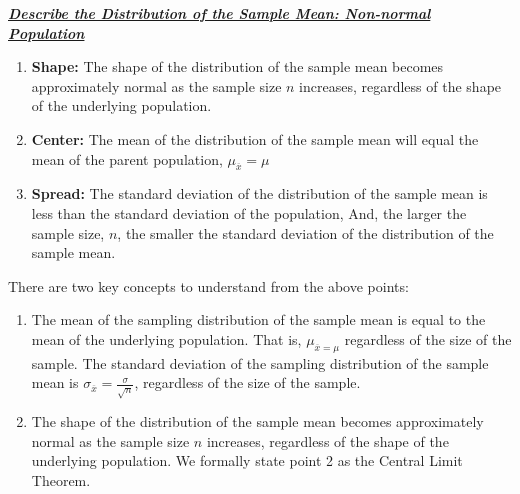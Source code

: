 \documentclass{report}
\begin{document}
     \pagebreak \bigbreak \noindent 
     \textbf{\textit{\underline{Describe the Distribution of the Sample Mean: Non-normal Population}}}
     \bigbreak \noindent 
     \begin{enumerate}
         \item \textbf{Shape:} The shape of the distribution of the sample mean becomes approximately normal as the sample size $n $ increases, regardless of the shape of the underlying population.
        \item \textbf{Center:} The mean of the distribution of the sample mean will equal the mean of the parent population, $\mu_{\overline{x}} = \mu$
        \item \textbf{Spread:} The standard deviation of the distribution of the sample mean is less than the standard deviation of the population, And, the larger the sample size, $n $, the smaller the standard deviation of the distribution of the sample mean.
     \end{enumerate}
     \bigbreak \noindent 
     There are two key concepts to understand from the above points:
     \begin{enumerate}
         \item The mean of the sampling distribution of the sample mean is equal to the mean of the underlying population. That is, $\mu_{\overline{x} = \mu} $ regardless of the size of the sample. The standard deviation of the sampling distribution of the sample mean is $\sigma_{\overline{x}} = \frac{\sigma}{\sqrt{n}} $, regardless of the size of the sample.
        \item The shape of the distribution of the sample mean becomes approximately normal as the sample size $n$ increases, regardless of the shape of the underlying population.
        \hspace{\parindent}  We formally state point 2 as the Central Limit Theorem.
     \end{enumerate}
\end{document}
